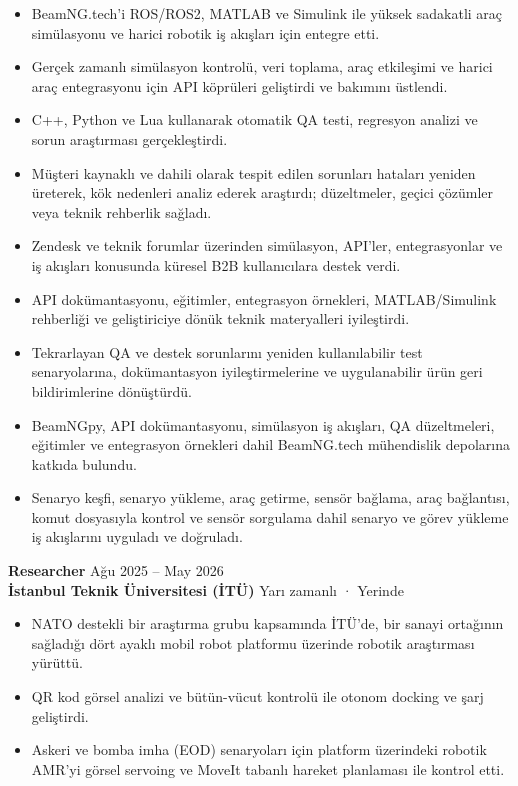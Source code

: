 \documentclass[11pt,a4paper]{article}
\begin{document}
\begin{itemize}
    \item BeamNG.tech'i ROS/ROS2, MATLAB ve Simulink ile yüksek sadakatli araç simülasyonu ve harici robotik iş akışları için entegre etti.
    \item Gerçek zamanlı simülasyon kontrolü, veri toplama, araç etkileşimi ve harici araç entegrasyonu için API köprüleri geliştirdi ve bakımını üstlendi.
    \item C++, Python ve Lua kullanarak otomatik QA testi, regresyon analizi ve sorun araştırması gerçekleştirdi.
    \item Müşteri kaynaklı ve dahili olarak tespit edilen sorunları hataları yeniden üreterek, kök nedenleri analiz ederek araştırdı; düzeltmeler, geçici çözümler veya teknik rehberlik sağladı.
    \item Zendesk ve teknik forumlar üzerinden simülasyon, API'ler, entegrasyonlar ve iş akışları konusunda küresel B2B kullanıcılara destek verdi.
    \item API dokümantasyonu, eğitimler, entegrasyon örnekleri, MATLAB/Simulink rehberliği ve geliştiriciye dönük teknik materyalleri iyileştirdi.
    \item Tekrarlayan QA ve destek sorunlarını yeniden kullanılabilir test senaryolarına, dokümantasyon iyileştirmelerine ve uygulanabilir ürün geri bildirimlerine dönüştürdü.
    \item BeamNGpy, API dokümantasyonu, simülasyon iş akışları, QA düzeltmeleri, eğitimler ve entegrasyon örnekleri dahil BeamNG.tech mühendislik depolarına katkıda bulundu.
    \item Senaryo keşfi, senaryo yükleme, araç getirme, sensör bağlama, araç bağlantısı, komut dosyasıyla kontrol ve sensör sorgulama dahil senaryo ve görev yükleme iş akışlarını uyguladı ve doğruladı.
\end{itemize}

\textbf{Researcher} \hfill Ağu 2025 -- May 2026\\
\textbf{İstanbul Teknik Üniversitesi (İTÜ)} \hfill Yarı zamanlı · Yerinde

\begin{itemize}
    \item NATO destekli bir araştırma grubu kapsamında İTÜ'de, bir sanayi ortağının sağladığı dört ayaklı mobil robot platformu üzerinde robotik araştırması yürüttü.
    \item QR kod görsel analizi ve bütün-vücut kontrolü ile otonom docking ve şarj geliştirdi.
    \item Askeri ve bomba imha (EOD) senaryoları için platform üzerindeki robotik AMR'yi görsel servoing ve MoveIt tabanlı hareket planlaması ile kontrol etti.
\end{itemize}
\end{document}
